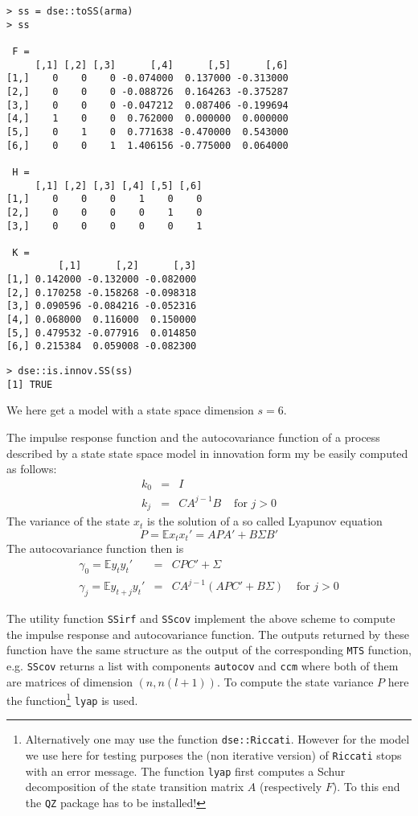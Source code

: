 \documentclass[]{article}
\let\rmarkdownfootnote\footnote%
\def\footnote{\protect\rmarkdownfootnote}
\begin{document}
\begin{verbatim}
> ss = dse::toSS(arma)
> ss

 F =
     [,1] [,2] [,3]      [,4]      [,5]      [,6]
[1,]    0    0    0 -0.074000  0.137000 -0.313000
[2,]    0    0    0 -0.088726  0.164263 -0.375287
[3,]    0    0    0 -0.047212  0.087406 -0.199694
[4,]    1    0    0  0.762000  0.000000  0.000000
[5,]    0    1    0  0.771638 -0.470000  0.543000
[6,]    0    0    1  1.406156 -0.775000  0.064000

 H =
     [,1] [,2] [,3] [,4] [,5] [,6]
[1,]    0    0    0    1    0    0
[2,]    0    0    0    0    1    0
[3,]    0    0    0    0    0    1

 K =
         [,1]      [,2]      [,3]
[1,] 0.142000 -0.132000 -0.082000
[2,] 0.170258 -0.158268 -0.098318
[3,] 0.090596 -0.084216 -0.052316
[4,] 0.068000  0.116000  0.150000
[5,] 0.479532 -0.077916  0.014850
[6,] 0.215384  0.059008 -0.082300
\end{verbatim}

\begin{verbatim}
> dse::is.innov.SS(ss)
[1] TRUE
\end{verbatim}

We here get a model with a state space dimension \(s=6\).

The impulse response function and the autocovariance function of a
process described by a state state space model in innovation form my be
easily computed as follows: \[
\begin{array}{rcll}
k_0 &=& I \\
k_j &=& C A^{j-1} B & \mbox{ for } j>0
\end{array}
\] The variance of the state \(x_t\) is the solution of a so called
Lyapunov equation \[
P = \mathbb{E} x_t x_t' = APA' + B\Sigma B'
\] The autocovariance function then is \[
\begin{array}{rcll}
\gamma_0 = \mathbb{E} y_t y_t' &=& C P C' + \Sigma  \\
\gamma_j = \mathbb{E} y_{t+j} y_t' &=& C A^{j-1} (APC' + B\Sigma) & \mbox{ for } j>0
\end{array}
\]

The utility function \texttt{SSirf} and \texttt{SScov} implement the
above scheme to compute the impulse response and autocovariance
function. The outputs returned by these function have the same structure
as the output of the corresponding \texttt{MTS} function, e.g.
\texttt{SScov} returns a list with components \texttt{autocov} and
\texttt{ccm} where both of them are matrices of dimension
\((n,n(l+1))\). To compute the state variance \(P\) here the
function\footnote{Alternatively one may use the function
  \texttt{dse::Riccati}. However for the model we use here for testing
  purposes the (non iterative version) of \texttt{Riccati} stops with an
  error message. The function \texttt{lyap} first computes a Schur
  decomposition of the state transition matrix \(A\) (respectively
  \(F\)). To this end the \texttt{QZ} package has to be installed!}
\texttt{lyap} is used.
\end{document}
